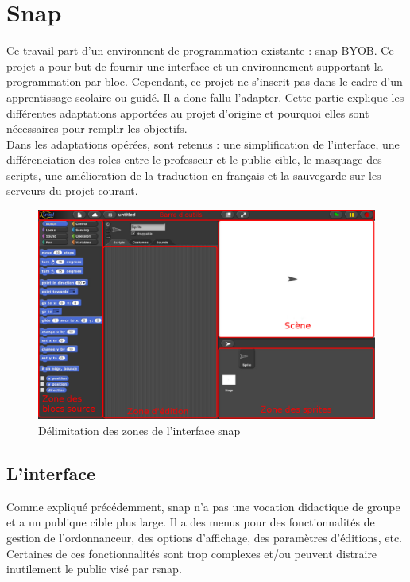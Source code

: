 \section{Snap}
\label{solution SNAP}
Ce travail part d'un environnent de programmation existante : \gls{snap} BYOB. Ce projet a pour but de fournir une interface et un environnement supportant la programmation par bloc. Cependant, ce projet ne s'inscrit pas dans le cadre d'un apprentissage scolaire ou guidé. Il a donc fallu l'adapter. Cette partie explique les différentes adaptations apportées au projet d'origine et pourquoi elles sont nécessaires pour remplir les objectifs.\\

Dans les adaptations opérées, sont retenus : une simplification de l'interface, une différenciation des \glspl{role} entre le professeur et le public cible, le masquage des \glspl{script}, une amélioration de la traduction en français et la sauvegarde sur les serveurs du projet courant.

\begin{figure}[]
  \begin{center}
  \includegraphics[width=\textwidth]{content/7-solution/2-snap/images/interface}
        \caption{Délimitation des zones de l'interface \gls{snap}}
    \label{fig:snap interface}
  \end{center}
\end{figure}

\subsection{L'interface}
\label{interface}
Comme expliqué précédemment, \gls{snap} n'a pas une vocation didactique de groupe et a un publique cible plus large. Il a des menus pour des fonctionnalités de gestion de l'ordonnanceur, des options d'affichage, des paramètres d'éditions, etc. Certaines de ces fonctionnalités sont trop complexes et/ou peuvent distraire inutilement le public visé par \gls{rsnap}.

